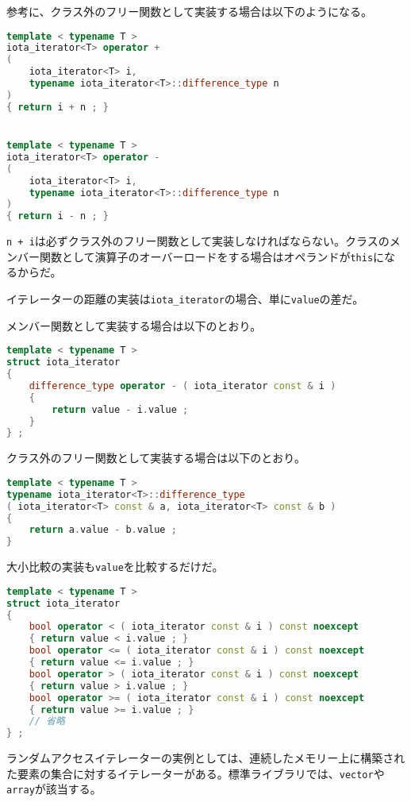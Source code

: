 \ifTombow\pagebreak\fi
参考に、クラス外のフリー関数として実装する場合は以下のようになる。

\begin{lstlisting}[language={C++}]
template < typename T >
iota_iterator<T> operator +
(
    iota_iterator<T> i,
    typename iota_iterator<T>::difference_type n
)
{ return i + n ; }


template < typename T >
iota_iterator<T> operator - 
(
    iota_iterator<T> i,
    typename iota_iterator<T>::difference_type n
)
{ return i - n ; }
\end{lstlisting}

\texttt{n + i}は必ずクラス外のフリー関数として実装しなければならない。クラスのメンバー関数として演算子のオーバーロードをする場合はオペランドが\texttt{this}になるからだ。

イテレーターの距離の実装は\texttt{iota\_iterator}の場合、単に\texttt{value}の差だ。

メンバー関数として実装する場合は以下のとおり。

\begin{lstlisting}[language={C++}]
template < typename T >
struct iota_iterator
{
    difference_type operator - ( iota_iterator const & i )
    {
        return value - i.value ;
    }
} ;
\end{lstlisting}

クラス外のフリー関数として実装する場合は以下のとおり。

\begin{lstlisting}[language={C++}]
template < typename T >
typename iota_iterator<T>::difference_type
( iota_iterator<T> const & a, iota_iterator<T> const & b )
{
    return a.value - b.value ;
}
\end{lstlisting}

\ifTombow\pagebreak\fi
大小比較の実装も\texttt{value}を比較するだけだ。

\begin{lstlisting}[language={C++}]
template < typename T >
struct iota_iterator 
{
    bool operator < ( iota_iterator const & i ) const noexcept 
    { return value < i.value ; }
    bool operator <= ( iota_iterator const & i ) const noexcept 
    { return value <= i.value ; }
    bool operator > ( iota_iterator const & i ) const noexcept 
    { return value > i.value ; }
    bool operator >= ( iota_iterator const & i ) const noexcept 
    { return value >= i.value ; }
    // 省略
} ;
\end{lstlisting}

ランダムアクセスイテレーターの実例としては、連続したメモリー上に構築された要素の集合に対するイテレーターがある。標準ライブラリでは、\texttt{vector}や\texttt{array}が該当する。

